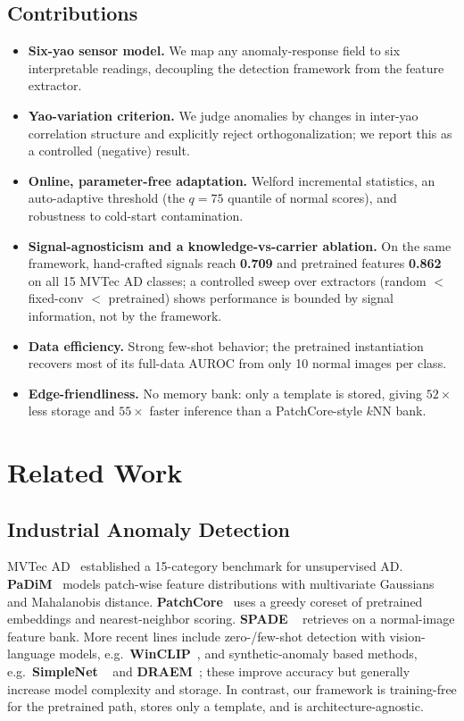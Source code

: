 \documentclass[journal,10pt]{IEEEtran}
\begin{document}
\subsection{Contributions}
\begin{itemize}
\item \textbf{Six-yao sensor model.} We map any anomaly-response field to
six interpretable readings, decoupling the detection framework from the
feature extractor.
\item \textbf{Yao-variation criterion.} We judge anomalies by changes in
inter-yao correlation structure and explicitly reject orthogonalization;
we report this as a controlled (negative) result.
\item \textbf{Online, parameter-free adaptation.} Welford incremental
statistics, an auto-adaptive threshold (the $q{=}75$ quantile of normal
scores), and robustness to cold-start contamination.
\item \textbf{Signal-agnosticism and a knowledge-vs-carrier ablation.}
On the same framework, hand-crafted signals reach \textbf{0.709} and
pretrained features \textbf{0.862} on all 15 MVTec AD classes; a controlled
sweep over extractors (random $<$ fixed-conv $<$ pretrained) shows
performance is bounded by signal information, not by the framework.
\item \textbf{Data efficiency.} Strong few-shot behavior; the pretrained
instantiation recovers most of its full-data AUROC from only 10 normal
images per class.
\item \textbf{Edge-friendliness.} No memory bank: only a template is
stored, giving \textbf{$52\times$} less storage and \textbf{$55\times$} faster
inference than a PatchCore-style $k$NN bank.
\end{itemize}

\section{Related Work}
\subsection{Industrial Anomaly Detection}
MVTec AD~\cite{bergmann2019mvtec} established a 15-category benchmark for
unsupervised AD. \textbf{PaDiM}~\cite{defard2021padim} models patch-wise
feature distributions with multivariate Gaussians and Mahalanobis
distance. \textbf{PatchCore}~\cite{roth2022patchcore} uses a greedy coreset
of pretrained embeddings and nearest-neighbor scoring. \textbf{SPADE}
~\cite{cohen2021spade} retrieves on a normal-image feature bank.
More recent lines include zero-/few-shot detection with vision-language
models, e.g.\ \textbf{WinCLIP}~\cite{jeong2023winclip}, and
synthetic-anomaly based methods, e.g.\ \textbf{SimpleNet}
~\cite{liu2023simplenet} and \textbf{DRAEM}~\cite{zavrtanik2021draem};
these improve accuracy but generally increase model complexity and
storage. In contrast, our framework is training-free for the pretrained
path, stores only a template, and is architecture-agnostic.
\end{document}
